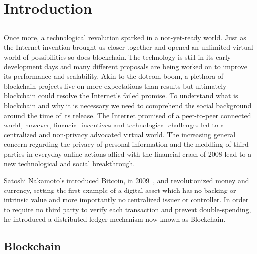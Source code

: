 \chapter{Introduction} \label{chap:intro}

\section*{}



Once more, a technological revolution sparked in a not-yet-ready world. Just as the Internet invention brought us closer together and opened an unlimited virtual world of possibilities so does blockchain. The technology is still in its early development days and many different proposals are being worked on to improve its performance and scalability. Akin to the dotcom boom, a plethora of blockchain projects live on more expectations than results but ultimately blockchain could resolve the Internet's failed promise. To understand what is blockchain and why it is necessary we need to comprehend the social background around the time of its release. The Internet promised of a peer-to-peer connected world, however, financial incentives and technological challenges led to a centralized and non-privacy advocated virtual world. The increasing general concern regarding the privacy of personal information and the meddling of third parties in everyday online actions allied with the financial crash of 2008 lead to a new technological and social breakthrough.

Satoshi Nakamoto's introduced Bitcoin, in 2009~\cite{Nakamoto2009Bitcoin:System}, and revolutionized money and currency, setting the first example of a digital asset which has no backing or intrinsic value and more importantly no centralized issuer or controller. In order to require no third party to verify each transaction and prevent double-spending, he introduced a distributed ledger mechanism now known as Blockchain.
\section{Blockchain}

